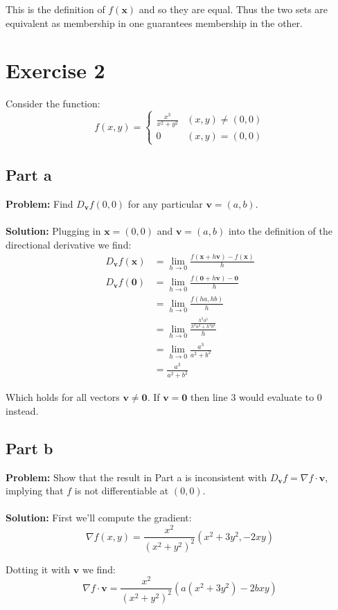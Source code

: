 \documentclass{article}
\begin{document}
This is the definition of $f(\mathbf x)$ and so they are equal. Thus the two sets are equivalent as membership in one guarantees membership in the other.

\section*{Exercise 2}
Consider the function:
$$f(x,y)=
\begin{cases}
      \frac{x^3}{x^2+y^2} & (x,y)\not=(0,0) \\
      0 & (x,y)=(0,0)
\end{cases}$$
\subsection*{Part a}
\textbf{Problem:} Find $D_{\mathbf v}f(0,0)$ for any particular $\mathbf v=(a,b)$.
\\\\
\textbf{Solution:} Plugging in $\mathbf x=(0,0)$ and $\mathbf v=(a,b)$ into the definition of the directional derivative we find:
\begin{align*}
  D_{\mathbf v}f(\mathbf x)&=\lim_{h\to0}\frac{f(\mathbf x+h\mathbf v)-f(\mathbf x)}{h}\\
  D_{\mathbf v}f(\mathbf 0)&=\lim_{h\to0}\frac{f(\mathbf 0+h\mathbf v)-\mathbf 0}{h}\\
  &=\lim_{h\to0}\frac{f(ha,hb)}{h}\\
  &=\lim_{h\to0}\frac{\frac{h^3a^3}{h^2a^2+h^2b^2}}{h}\tag{if $\mathbf v\not=\mathbf 0$}\\
  &=\lim_{h\to0}\frac{a^3}{a^2+b^2}\\
  &=\frac{a^3}{a^2+b^2}
\end{align*}

Which holds for all vectors $\mathbf v\not=\mathbf 0$. If $\mathbf v=\mathbf 0$ then line 3 would evaluate to 0 instead.

\subsection*{Part b}
\textbf{Problem:} Show that the result in Part a is inconsistent with $D_{\mathbf v}f=\nabla f\cdot\mathbf v$, implying that $f$ is not differentiable at $(0,0)$.
\\\\
\textbf{Solution:} First we'll compute the gradient:
$$\nabla f(x,y)=\frac{x^2}{(x^2+y^2)^2}\left(x^2+3y^2,-2xy\right)$$

Dotting it with $\mathbf v$ we find:
$$\nabla f\cdot\mathbf v=\frac{x^2}{(x^2+y^2)^2}\left(a(x^2+3y^2)-2bxy\right)$$
\end{document}
